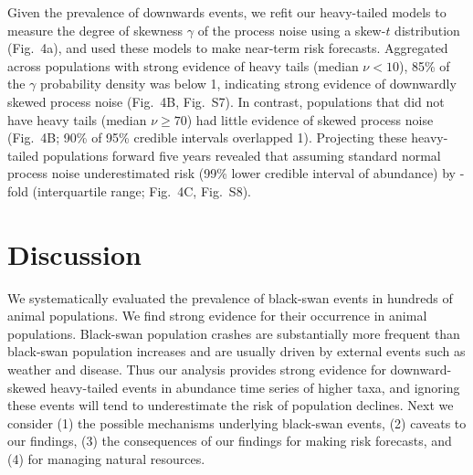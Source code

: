 \documentclass[9pt,twocolumn,twoside]{pnas-new}
\newcommand{\figskewnu}{{7}}
\newcommand{\figskewprojections}{{8}}
\begin{document}
Given the prevalence of downwards events, we refit our heavy-tailed models to
measure the degree of skewness \(\gamma\) of the process noise using a skew-$t$
distribution (Fig.~4a), and used these models to make near-term risk forecasts.
Aggregated across populations with strong evidence of heavy tails (median \(\nu
< 10\)), 85\% of the \(\gamma\) probability density was below 1, indicating
strong evidence of downwardly skewed process noise (Fig.~4B,
Fig.~S\figskewnu). In contrast, populations that did not have heavy
tails (median \(\nu \geq 70\)) had little evidence of skewed process noise
(Fig.~4B; 90\% of 95\% credible intervals overlapped 1). Projecting these
heavy-tailed populations forward five years revealed that assuming standard
normal process noise underestimated risk (99\% lower credible interval of
abundance) by \crashUnderRange-fold (interquartile range; Fig.~4C,
Fig.~S\figskewprojections).

\section*{Discussion}

We systematically evaluated the prevalence of black-swan events in hundreds of
animal populations.
We find strong evidence for their occurrence in animal populations. Black-swan
population crashes are substantially more frequent
than black-swan population
increases and are usually driven by external events such as weather and
disease.
Thus our analysis provides strong evidence
for downward-skewed heavy-tailed events in abundance time series of higher
taxa, and ignoring these events will tend to underestimate the risk of
population declines.
Next we consider
(1) the possible mechanisms underlying black-swan events,
(2) caveats to our findings,
(3) the consequences of our findings for making risk forecasts, and
(4) for managing natural resources.

\end{document}
